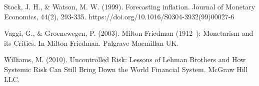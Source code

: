 \documentclass[
  man,floatsintext,
  man]{apa6}
\begin{document}
\begin{hangparas}{4em}{1}
\noindent Stock, J. H., \& Watson, M. W. (1999). Forecasting inflation. Journal of Monetary Economics, 44(2), 293-335. https://doi.org/10.1016/S0304-3932(99)00027-6 \newline
\end{hangparas}

\begin{hangparas}{4em}{1}
\noindent Vaggi, G., \& Groenewegen, P. (2003). Milton Friedman (1912--): Monetarism and its Critics. In Milton Friedman. Palgrave Macmillan UK.\newline
\end{hangparas}

\begin{hangparas}{4em}{1}
\noindent Williams, M. (2010). Uncontrolled Risk: Lessons of Lehman Brothers and How Systemic Risk Can Still Bring Down the World Financial System. McGraw Hill LLC.\newline
\end{hangparas}


\printbibliography
\end{document}
